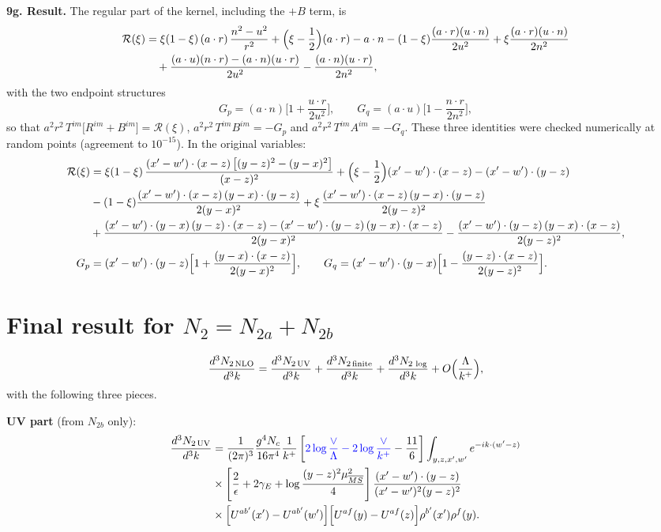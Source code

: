 \documentclass[10pt]{article}
\numberwithin{equation}{section}
\begin{document}
\textbf{9g. Result.} The regular part of the kernel, including the $+B$ term, is
\begin{align}
\mathcal{R}(\xi)&=\xi(1-\xi)\,(a\cdot r)\,\frac{n^{2}-u^{2}}{r^{2}}+\Big(\xi-\frac12\Big)(a\cdot r)-a\cdot n
-(1-\xi)\frac{(a\cdot r)(u\cdot n)}{2u^{2}}+\xi\frac{(a\cdot r)(u\cdot n)}{2n^{2}}\notag\\
&\quad+\frac{(a\cdot u)(n\cdot r)-(a\cdot n)(u\cdot r)}{2u^{2}}-\frac{(a\cdot n)(u\cdot r)}{2n^{2}},
\end{align}
with the two endpoint structures
\begin{equation}
G_{p}=(a\cdot n)\Big[1+\frac{u\cdot r}{2u^{2}}\Big],\qquad G_{q}=(a\cdot u)\Big[1-\frac{n\cdot r}{2n^{2}}\Big],
\end{equation}
so that $a^{2}r^{2}\,T^{im}\big[R^{im}+B^{im}\big]=\mathcal{R}(\xi)$, $a^{2}r^{2}\,T^{im}B^{im}=-G_{p}$ and $a^{2}r^{2}\,T^{im}A^{im}=-G_{q}$. These three identities were checked numerically at random points (agreement to $10^{-15}$). In the original variables:
\begin{align}
\mathcal{R}(\xi)&=\xi(1-\xi)\,\frac{(x'-w')\cdot(x-z)\,\big[(y-z)^{2}-(y-x)^{2}\big]}{(x-z)^{2}}+\Big(\xi-\frac12\Big)(x'-w')\cdot(x-z)-(x'-w')\cdot(y-z)\notag\\
&-(1-\xi)\frac{(x'-w')\cdot(x-z)\,(y-x)\cdot(y-z)}{2(y-x)^{2}}+\xi\,\frac{(x'-w')\cdot(x-z)\,(y-x)\cdot(y-z)}{2(y-z)^{2}}\notag\\
&+\frac{(x'-w')\cdot(y-x)\,(y-z)\cdot(x-z)-(x'-w')\cdot(y-z)\,(y-x)\cdot(x-z)}{2(y-x)^{2}}-\frac{(x'-w')\cdot(y-z)\,(y-x)\cdot(x-z)}{2(y-z)^{2}},\\
G_{p}&=(x'-w')\cdot(y-z)\Big[1+\frac{(y-x)\cdot(x-z)}{2(y-x)^{2}}\Big],\qquad
G_{q}=(x'-w')\cdot(y-x)\Big[1-\frac{(y-z)\cdot(x-z)}{2(y-z)^{2}}\Big].
\end{align}

\section{Final result for $N_{2}=N_{2a}+N_{2b}$}
\begin{equation}
\frac{d^{3}N_{2\,\rm NLO}}{d^{3}k}=\frac{d^{3}N_{2\,\rm UV}}{d^{3}k}+\frac{d^{3}N_{2\,\rm finite}}{d^{3}k}+\frac{d^{3}N_{2\,\log}}{d^{3}k}+O\Big(\frac{\Lambda}{k^{+}}\Big),
\end{equation}
with the following three pieces.

\textbf{UV part} (from $N_{2b}$ only):
\begin{align}
\frac{d^{3}N_{2\,\rm UV}}{d^{3}k}&=\frac{1}{(2\pi)^{3}}\frac{g^{4}N_{c}}{16\pi^{4}}\frac{1}{k^{+}}\left[{\color{blue}2\log\frac{\vee}{\Lambda}-2\log\frac{\vee}{k^{+}}}-\frac{11}{6}\right]\int_{y,z,x',w'}e^{-ik\cdot(w'-z)}\notag\\&\times\left[\frac{2}{\epsilon}+2\gamma_{E}+\log\frac{(y-z)^{2}\mu^{2}_{\overline{MS}}}{4}\right]\frac{(x'-w')\cdot(y-z)}{(x'-w')^{2}(y-z)^{2}}\notag\\
&\times\Big[U^{ab'}(x')-U^{ab'}(w')\Big]\Big[U^{af}(y)-U^{af}(z)\Big]\rho^{b'}(x')\rho^{f}(y).
\label{eq:finUV}
\end{align}
\end{document}
